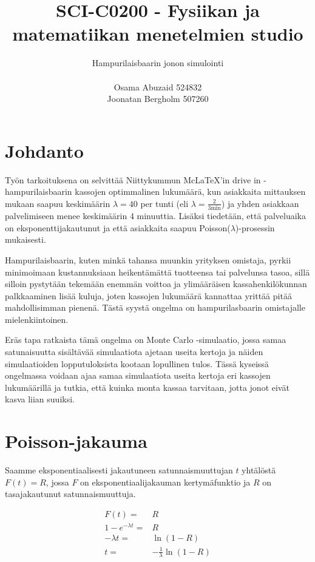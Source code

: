 \documentclass{article}     %
\title{SCI-C0200 - Fysiikan ja matematiikan menetelmien studio}
\author{Hampurilaisbaarin jonon simulointi\\ \\ Osama Abuzaid 524832 \\ Joonatan Bergholm 507260}
\begin{document}
\maketitle
\newpage

\pagestyle{fancy}
\lstset{language = Matlab}

\section*{Johdanto}

Työn tarkoituksena on selvittää Niittykummun Mc\LaTeX'in drive in -hampurilaisbaarin kassojen optimmalinen lukumäärä, kun asiakkaita mittauksen mukaan saapuu keskimäärin $\lambda = 40$ per tunti (eli $\lambda = \frac{2}{3 \mathrm{min}}$) ja yhden asiakkaan palvelimiseen menee keskimäärin 4 minuuttia. Lisäksi tiedetään, että palveluaika on eksponenttijakautunut ja että asiakkaita saapuu Poisson($\lambda$)-prosessin mukaisesti. \par
Hampurilaisbaarin, kuten minkä tahansa muunkin yrityksen omistaja, pyrkii minimoimaan kustannuksiaan heikentämättä tuotteensa tai palvelunsa tasoa, sillä silloin pystytään tekemään enemmän voittoa ja ylimääräisen kassahenkilökunnan palkkaaminen lisää kuluja, joten kassojen lukumäärä kannattaa yrittää pitää mahdollisimman pienenä. Tästä syystä ongelma on hampurilasbaarin omistajalle mielenkiintoinen. \par
Eräs tapa ratkaista tämä ongelma on Monte Carlo -simulaatio, jossa samaa satunaisuutta sisältävää simulaatiota ajetaan useita kertoja ja näiden simulaatioiden lopputuloksista kootaan lopullinen tulos. Tässä kyseissä ongelmassa voidaan ajaa samaa simulaatiota useita kertoja eri kassojen lukumäärillä ja tutkia, että kuinka monta kassaa tarvitaan, jotta jonot eivät kasva liian suuiksi.


\section*{Poisson-jakauma}

Saamme eksponentiaalisesti jakautuneen satunnaismuuttujan $t$ yhtälöstä $F(t) = R$, jossa $F$ on eksponentiaalijakauman kertymäfunktio ja $R$ on tasajakautunut satunnaismuuttuja.

\begin{align*}
F(t) =& R \\
1-e^{-\lambda t} =& R \\
-\lambda t =& \ln (1 - R) \\
t =& -\frac{1}{\lambda} \ln (1 - R)
\end{align*}
\end{document}
